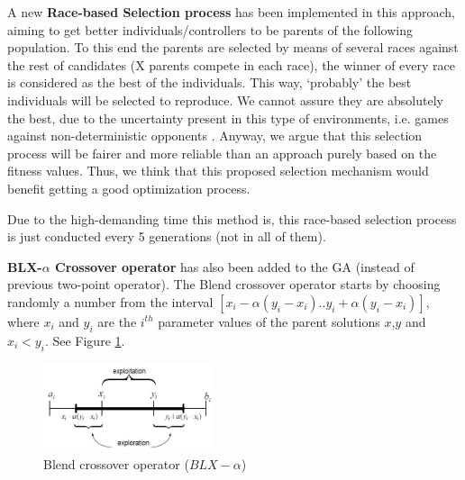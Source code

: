 \documentclass[conference]{IEEEtran}
\begin{document}
A new \textbf{Race-based Selection process} has been implemented in this approach, aiming to get better individuals/controllers to be parents of the following population. To this end the parents are selected by means of several races against the rest of candidates (X parents compete in each race), the 
winner of every race is considered as the best of the individuals.
This way, `probably' the best individuals will be selected to reproduce. We cannot assure they are absolutely the best, due to the uncertainty present in this type of environments, i.e. games against non-deterministic opponents \cite{merelo2016statistical}. Anyway, we argue that this selection process will be fairer and more reliable than an approach purely based on the fitness values. Thus, we think that this proposed selection mechanism would benefit getting a good optimization process.

Due to the high-demanding time this method is, this race-based selection process is just conducted every 5 generations (not in all of them).


\textbf{BLX-$\alpha$ Crossover operator} \cite{blx2008} has also been added to the GA (instead of previous two-point operator). 
The Blend crossover operator starts by choosing randomly a number from the interval $[x_i-\alpha(y_i-x_i).. y_i+\alpha(y_i-x_i)]$, where $x_i$ and $y_i$ are the
$i^{th}$ parameter values of the parent solutions $x$,$y$ and $x_i < y_i$. See Figure \ref{fig:blxalpha}.

\begin{figure}[!ht]	
	\begin{center}
		\includegraphics[width=5cm]{fig/blxalpha.jpg}
		\caption{Blend crossover operator ($BLX-\alpha$)}
		\label{fig:blxalpha}	
	\end{center}	
\end{figure}
\end{document}
